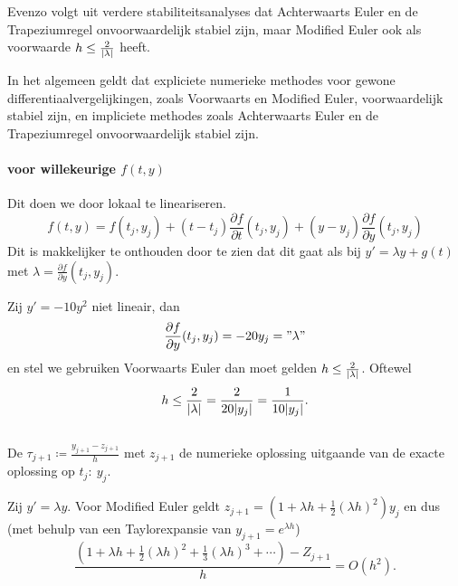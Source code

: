 \documentclass{2wn20summary}
\begin{document}
			 Evenzo volgt uit verdere stabiliteitsanalyses dat Achterwaarts Euler en de Trapeziumregel onvoorwaardelijk stabiel zijn, maar Modified Euler ook als voorwaarde $ h \le \frac{2}{{\left|\lambda\right|}} $ heeft.
			 \begin{theorem}In het algemeen geldt dat expliciete numerieke methodes voor gewone differentiaalvergelijkingen, zoals Voorwaarts en Modified Euler, voorwaardelijk stabiel zijn, en impliciete methodes zoals Achterwaarts Euler en de Trapeziumregel onvoorwaardelijk stabiel zijn.
			 	\end{theorem}

			 	\paragraph{ voor willekeurige $ f(t,y) $}

			 	Dit doen we door lokaal te lineariseren.
			 	\[
				 	f(t,y) = f(t_j,y_j) + (t-t_j) \frac{\partial f}{\partial t}(t_j,y_j) + (y-y_j)\frac{\partial f}{\partial y}(t_j,y_j)
			 	 \]
			 	 Dit is makkelijker te onthouden door te zien dat dit gaat als bij $y'=\lambda y +g(t)$ met $\lambda =\frac{\partial f}{\partial y}(t_j,y_j)$.
			 	 \begin{voorbeeld}

			 	 	Zij $ y'=-10y^2 $ niet lineair, dan
			 	 	\[
				 	 	\frac{\partial f}{\partial y}(t_j,y_j) = -20 y_j = "\lambda"
			 	 	 \] en stel we gebruiken Voorwaarts Euler dan moet gelden $ h \le \frac{2}{{\left|\lambda\right|}} $. Oftewel \[
				 	 	 h \le \frac{2}{{\left|\lambda\right|}}= \frac{2}{20{\left|y_j\right|}} = \frac{1}{10{\left|y_j\right|}}.
			 	 	  \]
		 	 	  \end{voorbeeld}

		\subsection{ }
			\begin{define}
			De  $\tau_{j+1} \coloneqq \frac{y_{j+1}-z_{j+1}}{h}$ met $z_{j+1}$ de numerieke oplossing uitgaande van de exacte oplossing op $t_j:\ y_j$.
			\end{define}

			\begin{voorbeeld}
				Zij $y'=\lambda y$.
				Voor Modified Euler geldt $ z_{j+1} = (1+\lambda h + \frac{1}{2} (\lambda h)^2)y_j $ en dus (met behulp van een Taylorexpansie van $y_{j+1}=e^{\lambda h}$)
				\[
					\frac{(1+\lambda h + \frac{1}{2}(\lambda h)^2 + \frac{1}{3}(\lambda h)^3+\dotsm) - Z_{j+1}}{h} = O(h^2).
				 \]
			\end{voorbeeld}
\end{document}
